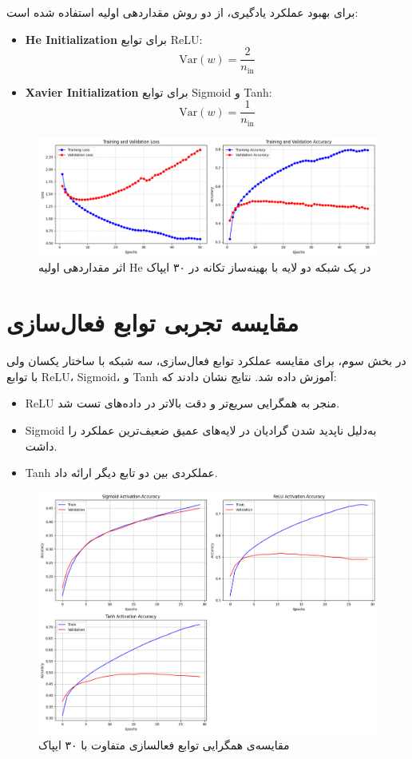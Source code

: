 	برای بهبود عملکرد یادگیری، از دو روش مقداردهی اولیه استفاده شده است:
	
	\begin{itemize}
		\item \textbf{He Initialization} برای توابع ReLU:
		\[
		\text{Var}(w) = \frac{2}{n_{\text{in}}}
		\]
		
		\item \textbf{Xavier Initialization} برای توابع Sigmoid و Tanh:
		\[
		\text{Var}(w) = \frac{1}{n_{\text{in}}}
		\]
	\end{itemize}
	
	\begin{figure}[h]
		\centering
		\includegraphics[width=0.7\linewidth]{images/task4-4}
		\caption{اثر مقداردهی اولیه He در یک شبکه دو لایه با بهینه‌ساز تکانه در ۳۰ ایپاک}
		\label{fig:task4-4}
	\end{figure}
	
	
	\section*{مقایسه تجربی توابع فعال‌سازی}
	
	در بخش سوم، برای مقایسه عملکرد توابع فعال‌سازی، سه شبکه با ساختار یکسان ولی با توابع ReLU، Sigmoid، و Tanh آموزش داده شد. نتایج نشان دادند که:
	
	\begin{itemize}
		\item ReLU منجر به همگرایی سریع‌تر و دقت بالاتر در داده‌های تست شد.
		\item Sigmoid به‌دلیل ناپدید شدن گرادیان در لایه‌های عمیق ضعیف‌ترین عملکرد را داشت.
		\item Tanh عملکردی بین دو تابع دیگر ارائه داد.
	\end{itemize}
		\begin{figure}[h]
		\centering
		\includegraphics[width=0.7\linewidth]{images/task4-2}
		\caption{مقایسه‌ی همگرایی توابع فعالسازی متفاوت با ۳۰ ایپاک}
		\label{fig:task4-2}
	\end{figure}
	
